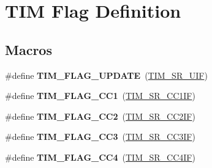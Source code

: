 \hypertarget{group___t_i_m___flag__definition}{}\section{T\+IM Flag Definition}
\label{group___t_i_m___flag__definition}
\subsection*{Macros}
\begin{DoxyCompactItemize}
\item 
\mbox{\label{group___t_i_m___flag__definition_gac45ce66cf33b4f324323fc3036917712}} 
\#define {\bfseries T\+I\+M\+\_\+\+F\+L\+A\+G\+\_\+\+U\+P\+D\+A\+TE}~(\hyperlink{group___peripheral___registers___bits___definition_gac8c03fabc10654d2a3f76ea40fcdbde6}{T\+I\+M\+\_\+\+S\+R\+\_\+\+U\+IF})
\item 
\mbox{\label{group___t_i_m___flag__definition_gaa7eb8be054b9bd217a9abb1c8687cc55}} 
\#define {\bfseries T\+I\+M\+\_\+\+F\+L\+A\+G\+\_\+\+C\+C1}~(\hyperlink{group___peripheral___registers___bits___definition_ga449a61344a97608d85384c29f003c0e9}{T\+I\+M\+\_\+\+S\+R\+\_\+\+C\+C1\+IF})
\item 
\mbox{\label{group___t_i_m___flag__definition_ga9cae242f1c51b31839ffc5bc007c82a7}} 
\#define {\bfseries T\+I\+M\+\_\+\+F\+L\+A\+G\+\_\+\+C\+C2}~(\hyperlink{group___peripheral___registers___bits___definition_ga25a48bf099467169aa50464fbf462bd8}{T\+I\+M\+\_\+\+S\+R\+\_\+\+C\+C2\+IF})
\item 
\mbox{\label{group___t_i_m___flag__definition_ga052c380f922219659810e4fceb574a7c}} 
\#define {\bfseries T\+I\+M\+\_\+\+F\+L\+A\+G\+\_\+\+C\+C3}~(\hyperlink{group___peripheral___registers___bits___definition_gad3cf234a1059c0a04799e88382cdc0f2}{T\+I\+M\+\_\+\+S\+R\+\_\+\+C\+C3\+IF})
\item 
\mbox{\label{group___t_i_m___flag__definition_gafd0dc57b56941f8b8250d66e289542db}} 
\#define {\bfseries T\+I\+M\+\_\+\+F\+L\+A\+G\+\_\+\+C\+C4}~(\hyperlink{group___peripheral___registers___bits___definition_gacade8a06303bf216bfb03140c7e16cac}{T\+I\+M\+\_\+\+S\+R\+\_\+\+C\+C4\+IF})

\end{DoxyCompactItemize}
